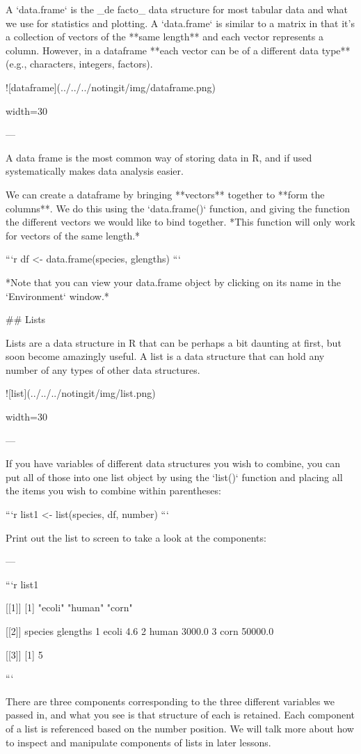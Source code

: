 A `data.frame` is the _de facto_ data structure for most tabular data and what we use for statistics and plotting. A `data.frame` is similar to a matrix in that it's a collection of vectors of the **same length** and each vector represents a column. However, in a dataframe **each vector can be of a different data type** (e.g., characters, integers, factors). 

![dataframe](../../../notingit/img/dataframe.png){width=30%

---

A data frame is the most common way of storing data in R, and if used systematically makes data analysis easier. 

We can create a dataframe by bringing **vectors** together to **form the columns**. We do this using the `data.frame()` function, and giving the function the different vectors we would like to bind together. *This function will only work for vectors of the same length.*

```r
df <- data.frame(species, glengths)
```

*Note that you can view your data.frame object by clicking on its name in the `Environment` window.*


## Lists

Lists are a data structure in R that can be perhaps a bit daunting at first, but soon become amazingly useful. A list is a data structure that can hold any number of any types of other data structures.

![list](../../../notingit/img/list.png){width=30%

---

If you have variables of different data structures you wish to combine, you can put all of those into one list object by using the `list()` function and placing all the items you wish to combine within parentheses:

```r
list1 <- list(species, df, number)
```

Print out the list to screen to take a look at the components:

---


```r
list1
	
[[1]]
[1] "ecoli" "human" "corn" 

[[2]]
  species glengths
1   ecoli      4.6
2   human   3000.0
3    corn  50000.0

[[3]]
[1] 5

```

There are three components corresponding to the three different variables we passed in, and what you see is that structure of each is retained. Each component of a list is referenced based on the number position. We will talk more about how to inspect and manipulate components of lists in later lessons.

}}
